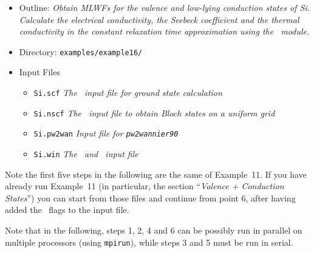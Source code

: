 \documentclass[a4paper,11pt,twoside]{article}
\begin{document}
\begin{itemize}
\item{Outline: \it{Obtain MLWFs for the valence and low-lying
    conduction states of Si. Calculate the electrical conductivity, the
    Seebeck coefficient and the thermal conductivity in the constant
    relaxation time approximation using the \bw\ module.}} 
\item{Directory: {\tt examples/example16/}}
\item{Input Files}
\begin{itemize}
\item{ {\tt Si.scf}  {\it The \pwscf\ input file for ground state
    calculation}} 
\item{ {\tt Si.nscf}  {\it The \pwscf\ input file to obtain Bloch
    states on a uniform grid}} 
\item{ {\tt Si.pw2wan}  {\it Input file for {\tt pw2wannier90}}}
\item{ {\tt Si.win}  {\it The \wannier\ and \postw\ input file}}
\end{itemize}

\end{itemize}

Note the first five steps in the following are the same of Example~11.
If you have already run Example~11 (in particular, the section ``\emph{Valence + Conduction States}'')
you can start from those files and continue from point 6, after having
added the \bw\ flags to the input file.

Note that in the following, steps 1, 2, 4 and 6 can be possibly run in parallel
on multiple processors (using {\tt mpirun}), while steps 3 and 5 must
be run in serial.
\end{document}
